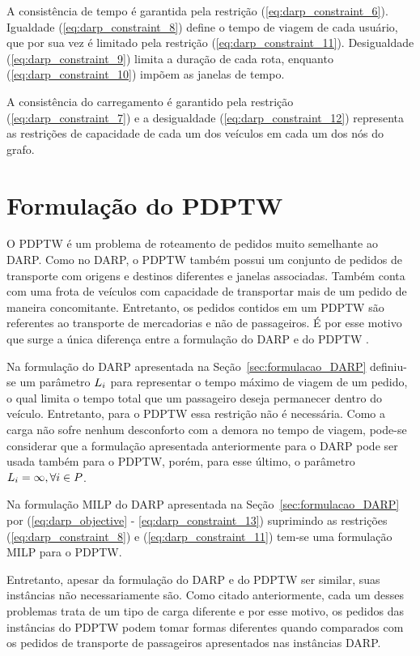 A consistência de tempo é garantida pela restrição
(\ref{eq:darp_constraint_6}).
Igualdade (\ref{eq:darp_constraint_8}) define o tempo de viagem de cada
usuário, que por sua vez é limitado pela restrição
(\ref{eq:darp_constraint_11}).
Desigualdade (\ref{eq:darp_constraint_9}) limita a duração de cada
rota, enquanto (\ref{eq:darp_constraint_10}) impõem as janelas de tempo.


A consistência do carregamento é garantido pela restrição 
(\ref{eq:darp_constraint_7}) e a desigualdade (\ref{eq:darp_constraint_12})
representa as restrições de capacidade de cada um dos veículos em cada um dos
nós do grafo.





\section{Formulação do PDPTW}\label{sec:formulacao_PDPTW}

O PDPTW é um problema de roteamento de pedidos muito semelhante ao DARP.
Como no DARP, o PDPTW também possui um conjunto de pedidos de transporte com
origens e destinos diferentes e janelas associadas.
Também conta com uma frota de veículos com capacidade de transportar mais de um
pedido de maneira concomitante.
Entretanto, os pedidos contidos em um PDPTW são referentes ao transporte de
mercadorias e não de passageiros.
É por esse motivo que surge a única diferença entre a formulação do DARP e do
PDPTW \cite{parragh_survey_2008}.

Na formulação do DARP apresentada na Seção~\ref{sec:formulacao_DARP} definiu-se
um parâmetro $L_i$ para representar o tempo máximo de viagem
de um pedido, o qual limita o tempo total que um passageiro deseja permanecer
dentro do veículo.
Entretanto, para o PDPTW essa restrição não é necessária. Como a carga não
sofre nenhum desconforto com a demora no tempo de viagem, pode-se considerar 
que a formulação apresentada anteriormente para o DARP pode ser usada também 
para o PDPTW, porém, para esse último, o parâmetro 
$L_i = \infty, \forall i \in P$.

Na formulação MILP do DARP apresentada na Seção~\ref{sec:formulacao_DARP} por
(\ref{eq:darp_objective} - \ref{eq:darp_constraint_13}) suprimindo as
restrições (\ref{eq:darp_constraint_8}) e (\ref{eq:darp_constraint_11}) 
tem-se uma formulação MILP para o PDPTW.

\iffalse
Entretanto, apesar da formulação do DARP e do PDPTW ser similar, suas
instâncias não necessariamente são.
Como citado anteriormente, cada um desses problemas trata de um tipo de carga
diferente e por esse motivo, os pedidos das instâncias do PDPTW podem tomar
formas diferentes quando comparados com os pedidos de transporte de passageiros
apresentados nas instâncias DARP.

